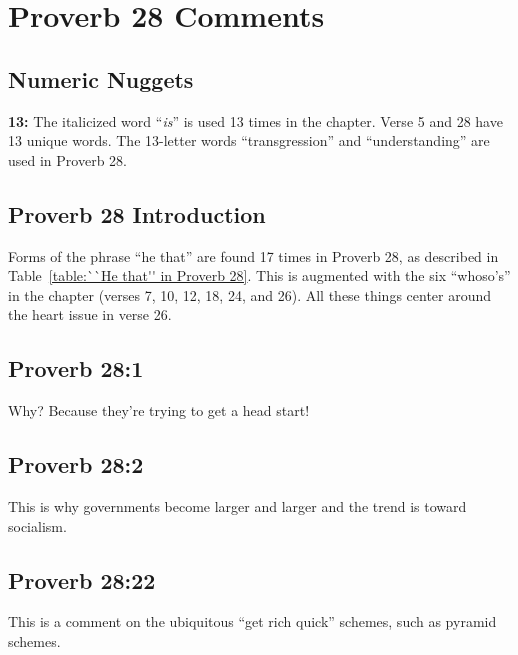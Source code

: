 \section{Proverb 28 Comments}

\subsection{Numeric Nuggets}
\textbf{13:} The italicized word ``\emph{is}'' is used 13 times in the chapter.  Verse 5 and 28 have 13 unique words.  The 13-letter words ``transgression'' and ``understanding'' are used in Proverb 28. 

\subsection{Proverb 28 Introduction}
Forms of the phrase ``he that'' are found 17 times in Proverb 28, as described in Table~\ref{table:``He that'' in Proverb 28}. This is augmented with the six ``whoso's'' in the chapter (verses 7, 10, 12, 18, 24, and 26). All these things center around the heart issue in verse 26.



\subsection{Proverb 28:1}
Why? Because they're trying to get a head start!

\subsection{Proverb 28:2}
This is why governments become larger and larger and the trend is toward socialism.

\subsection{Proverb 28:22}
This is a comment on the ubiquitous ``get rich quick'' schemes, such as pyramid schemes.

